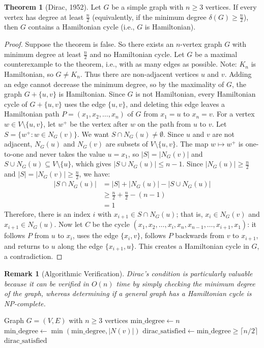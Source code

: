 \documentclass{article}
\newtheorem{remark}{Remark}
\theoremstyle{definition}
\newtheorem{theorem}{Theorem}
\begin{document}
\begin{theorem}[Dirac, 1952]
Let $G$ be a simple graph with $n \geq 3$ vertices. If every vertex has degree at least $\frac{n}{2}$ (equivalently, if the minimum degree $\delta(G) \geq \frac{n}{2}$), then $G$ contains a Hamiltonian cycle (i.e., $G$ is Hamiltonian).
\end{theorem}
\begin{proof}
Suppose the theorem is false. So there exists an $n$-vertex graph $G$ with minimum degree at least $\frac{n}{2}$ and no Hamiltonian cycle.
Let $G$ be a maximal counterexample to the theorem, i.e., with as many edges as possible.
Note: $K_n$ is Hamiltonian, so $G \neq K_n$. Thus there are non-adjacent vertices $u$ and $v$. Adding an edge cannot decrease the minimum degree, so by the maximality of $G$, the graph $G + \{u,v\}$ is Hamiltonian.
Since $G$ is not Hamiltonian, every Hamiltonian cycle of $G + \{u,v\}$ uses the edge $\{u,v\}$, and deleting this edge leaves a Hamiltonian path $P = (x_1, x_2, \ldots, x_n)$ of $G$ from $x_1 = u$ to $x_n = v$.
For a vertex $w \in V \setminus \{u,v\}$, let $w^+$ be the vertex after $w$ on the path from $u$ to $v$.
Let $S = \{w^+ : w \in N_G(v)\}$.
We want $S \cap N_G(u) \neq \emptyset$.
Since $u$ and $v$ are not adjacent, $N_G(u)$ and $N_G(v)$ are subsets of $V \setminus \{u,v\}$. The map $w \mapsto w^+$ is one-to-one and never takes the value $u = x_1$, so $|S| = |N_G(v)|$ and $S \cup N_G(u) \subseteq V \setminus \{u\}$, which gives $|S \cup N_G(u)| \leq n-1$.
Since $|N_G(u)| \geq \frac{n}{2}$ and $|S| = |N_G(v)| \geq \frac{n}{2}$, we have:
\begin{align*}
|S \cap N_G(u)| &= |S| + |N_G(u)| - |S \cup N_G(u)|\\
&\geq \frac{n}{2} + \frac{n}{2} - (n-1)\\
&= 1
\end{align*}
Therefore, there is an index $i$ with $x_{i+1} \in S \cap N_G(u)$; that is, $x_i \in N_G(v)$ and $x_{i+1} \in N_G(u)$.
Now let $C$ be the cycle $(x_1, x_2, \ldots, x_i, x_n, x_{n-1}, \ldots, x_{i+1}, x_1)$: it follows $P$ from $u$ to $x_i$, uses the edge $\{x_i, v\}$, follows $P$ backwards from $v$ to $x_{i+1}$, and returns to $u$ along the edge $\{x_{i+1}, u\}$.
This creates a Hamiltonian cycle in $G$, a contradiction.
\end{proof}
\begin{remark}[Algorithmic Verification]
Dirac's condition is particularly valuable because it can be verified in $O(n)$ time by simply checking the minimum degree of the graph, whereas determining if a general graph has a Hamiltonian cycle is NP-complete.
\end{remark}
\begin{algorithm}
\caption{Verify Dirac's Condition}
\begin{algorithmic}[1]
\Require Graph $G = (V, E)$ with $n \geq 3$ vertices
\State $\text{min\_degree} \gets n$
    \State $\text{min\_degree} \gets \min(\text{min\_degree}, |N(v)|)$
\EndFor
\State $\text{dirac\_satisfied} \gets \text{min\_degree} \geq \lceil n/2 \rceil$
\State \Return $\text{dirac\_satisfied}$
\end{algorithmic}
\end{algorithm}
\end{document}
